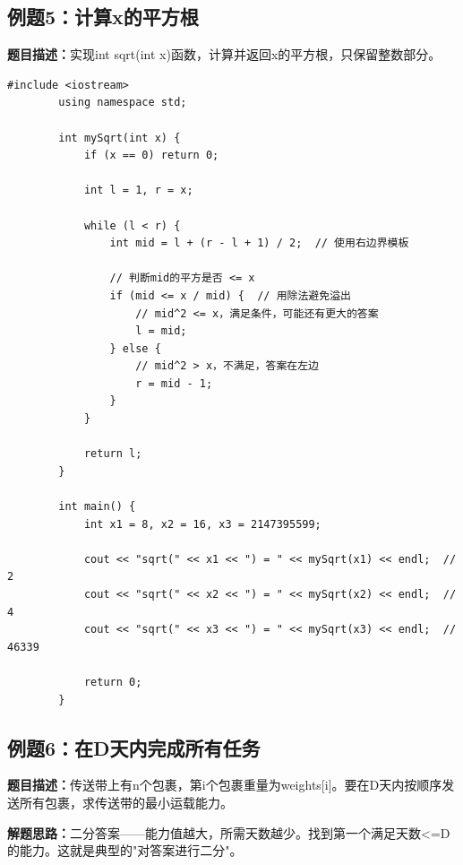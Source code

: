 \documentclass[12pt,a4paper]{article}
\begin{document}
	\subsection{例题5：计算x的平方根}
	
	\textbf{题目描述：}实现int sqrt(int x)函数，计算并返回x的平方根，只保留整数部分。
	
	\begin{lstlisting}[caption={例题5：x的平方根（整数版本）}]
		#include <iostream>
		using namespace std;
		
		int mySqrt(int x) {
			if (x == 0) return 0;
			
			int l = 1, r = x;
			
			while (l < r) {
				int mid = l + (r - l + 1) / 2;  // 使用右边界模板
				
				// 判断mid的平方是否 <= x
				if (mid <= x / mid) {  // 用除法避免溢出
					// mid^2 <= x，满足条件，可能还有更大的答案
					l = mid;
				} else {
					// mid^2 > x，不满足，答案在左边
					r = mid - 1;
				}
			}
			
			return l;
		}
		
		int main() {
			int x1 = 8, x2 = 16, x3 = 2147395599;
			
			cout << "sqrt(" << x1 << ") = " << mySqrt(x1) << endl;  // 2
			cout << "sqrt(" << x2 << ") = " << mySqrt(x2) << endl;  // 4
			cout << "sqrt(" << x3 << ") = " << mySqrt(x3) << endl;  // 46339
			
			return 0;
		}
	\end{lstlisting}
	
	\subsection{例题6：在D天内完成所有任务}
	
	\textbf{题目描述：}传送带上有n个包裹，第i个包裹重量为weights[i]。要在D天内按顺序发送所有包裹，求传送带的最小运载能力。
	
	\textbf{解题思路：}二分答案——能力值越大，所需天数越少。找到第一个满足天数<=D的能力。这就是典型的"对答案进行二分"。
	
\end{document}
